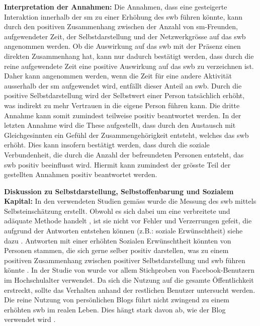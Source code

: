 \textbf{Interpretation der Annahmen:}\newline
Die Annahmen, dass eine gesteigerte Interaktion innerhalb der \gls{sm} zu einer Erhöhung des \gls{swb} führen könnte, kann durch den positiven Zusammenhang zwischen der Anzahl von \gls{sm}-Freunden, aufgewendeter Zeit, der Selbstdarstellung und der Netzwerkgrösse auf das \gls{swb} angenommen werden.\newline
Ob die Auswirkung auf das \gls{swb} mit der Präsenz einen direkten Zusammenhang hat, kann nur dadurch bestätigt werden, dass durch die reine aufgewendete Zeit eine positive Auswirkung auf das \gls{swb} zu verzeichnen ist. Daher kann angenommen werden, wenn die Zeit für eine andere Aktivität ausserhalb der \gls{sm} aufgewendet wird, entfällt dieser Anteil an \gls{swb}.\newline
Durch die positive Selbstdarstellung wird der Selbstwert einer Person tatsächlich erhöht, was indirekt zu mehr Vertrauen in die eigene Person führen kann. Die dritte Annahme kann somit zumindest teilweise positiv beantwortet werden.\newline
In der letzten Annahme wird die These aufgestellt, dass durch den Austausch mit Gleichgesinnten ein Gefühl der Zusammengehörigkeit entsteht, welches das \gls{swb} erhöht. Dies kann insofern bestätigt werden, dass durch die soziale Verbundenheit, die durch die Anzahl der befreundeten Personen entsteht, das \gls{swb} positiv beeinflusst wird.\newline
Hiermit kann zumindest der grösste Teil der gestellten Annahmen positiv beantwortet werden.\par  
\textbf{Diskussion zu Selbstdarstellung, Selbstoffenbarung und Sozialem Kapital:}\newline
In den verwendeten Studien gemäss  wurde die Messung des \gls{swb} mittels Selbsteinschätzung erstellt. Obwohl es sich dabei um eine verbreitete und adäquate Methode handelt \cite{Diener:2005}, ist sie nicht vor Fehler und Verzerrungen gefeit, die aufgrund der Antworten entstehen können (z.B.: soziale Erwünschtheit) siehe dazu . Antworten mit einer erhöhten Sozialen Erwünschtheit könnten von Personen stammen, die sich gerne selber positiv darstellen, was zu einem positiven Zusammenhang zwischen positiver Selbstdarstellung und \gls{swb} führen könnte \cite{Diener:1991}.\newline
In der Studie von  wurde vor allem Stichproben von Facebook-Benutzern im Hochschulalter verwendet. Da sich die Nutzung auf die gesamte Öffentlichkeit erstreckt, sollte das Verhalten anhand der restlichen Benutzer untersucht werden.\newline
Die reine Nutzung von persönlichen Blogs führt nicht zwingend zu einem erhöhten \gls{swb} im realen Leben. Dies hängt stark davon ab, wie der Blog verwendet wird \cite{Jung:2012}.\par 

